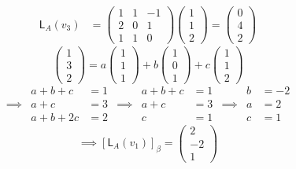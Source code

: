 \begin{enumerate}[(a)]
\begin{align}
\mathsf{L}_A(v_3)
&= \begin{pmatrix}1&1&-1\\2&0&1\\1&1&0\end{pmatrix}\begin{pmatrix}1\\1\\2\end{pmatrix}
= \begin{pmatrix}0\\4\\2\end{pmatrix}
\end{align}
\begin{equation}
\begin{pmatrix}1\\3\\2\end{pmatrix}=
a\begin{pmatrix}1\\1\\1\end{pmatrix} +
b\begin{pmatrix}1\\0\\1\end{pmatrix} +
c\begin{pmatrix}1\\1\\2\end{pmatrix}
\end{equation}
\begin{align*}
& a+b+c &=1 & & a+b +c &=1 & & b &= -2\\
\implies& a +c &=3 &\implies& a+c &= 3 &\implies& a &=2\\
& a+b + 2c &= 2 & & c &=1 & &c &=1
\end{align*}
\begin{equation}
\implies \left[\mathsf{L}_A(v_1)\right]_\beta = \begin{pmatrix}2\\-2\\1\end{pmatrix}
\end{equation}


\end{enumerate}
